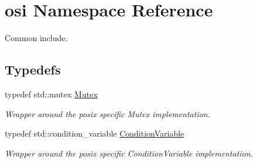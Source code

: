 \hypertarget{namespaceosi}{}\section{osi Namespace Reference}
\label{namespaceosi}


Common include.  


\subsection*{Typedefs}
\begin{DoxyCompactItemize}
\item 
\mbox{\label{namespaceosi_ac3d484da0f89f06e329d4b84d7459d9b}} 
typedef std\+::mutex \hyperlink{namespaceosi_ac3d484da0f89f06e329d4b84d7459d9b}{Mutex}
\begin{DoxyCompactList}\small\item\em Wrapper around the posix specific Mutex implementation. \end{DoxyCompactList}\item 
\mbox{\label{namespaceosi_a31b1ce104b168554e4832b5d3b684073}} 
typedef std\+::condition\+\_\+variable \hyperlink{namespaceosi_a31b1ce104b168554e4832b5d3b684073}{Condition\+Variable}
\begin{DoxyCompactList}\small\item\em Wrapper around the posix specific Condition\+Variable implementation. \end{DoxyCompactList}\end{DoxyCompactItemize}
